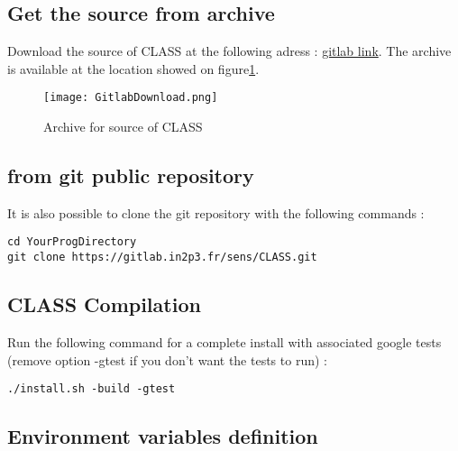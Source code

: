 \subsection{Get the source from archive}

Download the source of CLASS at the following adress : \href{https://gitlab.in2p3.fr/sens/CLASS/tree/master}{gitlab link}. The archive is available at the location showed on figure\ref{fig:CLASSArchive}.

    \begin{figure}[H]
    \centering
    \centerline{\texttt{[image: GitlabDownload.png]}}
    \caption{Archive for source of CLASS}
    \label{fig:CLASSArchive}
    \end{figure}

\subsection{from git public repository}

It is also possible to clone the git repository with the following commands : 

\begin{center}
\begin{minipage}{\textwidth}
\begin{lstlisting}[style=terminal]
cd YourProgDirectory
git clone https://gitlab.in2p3.fr/sens/CLASS.git
\end{lstlisting}
\end{minipage}
\end{center}

\subsection{CLASS Compilation}

Run the following command for a complete install with associated google tests (remove option -gtest if you don't want the tests to run) : 

\begin{center}
\begin{minipage}{\textwidth}
\begin{lstlisting}[style=terminal]
./install.sh -build -gtest
\end{lstlisting}
\end{minipage}
\end{center}

\subsection{Environment variables definition}

